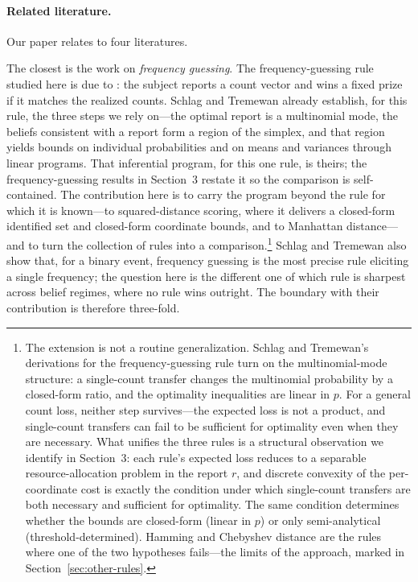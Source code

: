 \paragraph{Related literature.}
Our paper relates to four literatures.

The closest is the work on \emph{frequency guessing}.
The frequency-guessing rule studied here is due to \citet{SchlagTremewan2021}: the subject reports a count vector and wins a fixed prize if it matches the realized counts.
Schlag and Tremewan already establish, for this rule, the three steps we rely on---the optimal report is a multinomial mode, the beliefs consistent with a report form a region of the simplex, and that region yields bounds on individual probabilities and on means and variances through linear programs.
That inferential program, for this one rule, is theirs; the frequency-guessing results in Section~3 restate it so the comparison is self-contained.
The contribution here is to carry the program beyond the rule for which it is known---to squared-distance scoring, where it delivers a closed-form identified set and closed-form coordinate bounds, and to Manhattan distance---and to turn the collection of rules into a comparison.\footnote{The extension is not a routine generalization. Schlag and Tremewan's derivations for the frequency-guessing rule turn on the multinomial-mode structure: a single-count transfer changes the multinomial probability by a closed-form ratio, and the optimality inequalities are linear in \(p\). For a general count loss, neither step survives---the expected loss is not a product, and single-count transfers can fail to be sufficient for optimality even when they are necessary. What unifies the three rules is a structural observation we identify in Section~3: each rule's expected loss reduces to a separable resource-allocation problem in the report \(r\), and discrete convexity of the per-coordinate cost is exactly the condition under which single-count transfers are both necessary and sufficient for optimality. The same condition determines whether the bounds are closed-form (linear in \(p\)) or only semi-analytical (threshold-determined). Hamming and Chebyshev distance are the rules where one of the two hypotheses fails---the limits of the approach, marked in Section~\ref{sec:other-rules}.}
Schlag and Tremewan also show that, for a binary event, frequency guessing is the most precise rule eliciting a single frequency; the question here is the different one of which rule is sharpest across belief regimes, where no rule wins outright.
The boundary with their contribution is therefore three-fold.

